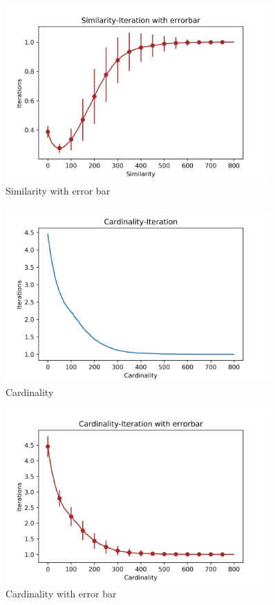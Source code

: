 \documentclass[a4paper,12pt]{article}
\begin{document}
	\begin{figure}[H]
	\centering
	\includegraphics[width=0.9\textwidth]{SimErr50_3_800_100}
	\caption{Similarity with error bar}\label{SimErr50_3_800_100}
    \end{figure}
%
	\begin{figure}[H]
	\centering
	\includegraphics[width=0.9\textwidth]{Card50_3_800_100}
	\caption{Cardinality}\label{Card50_3_800_100}
   \end{figure}
%
	\begin{figure}[H]
	\centering
	\includegraphics[width=0.9\textwidth]{CardErr50_3_800_100}
	\caption{Cardinality with error bar}\label{CardErr50_3_800_100}
    \end{figure}	
\end{document}
